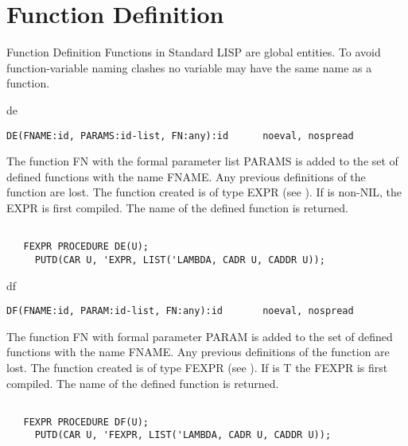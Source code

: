 \section{Function Definition}
\begin{Introduction}{Function Definition}
Functions in Standard LISP are global entities. To avoid
function-variable naming clashes no variable may have the same name as
a function. 
\end{Introduction}

\begin{Function}{de}
\begin{verbatim}
DE(FNAME:id, PARAMS:id-list, FN:any):id      noeval, nospread
\end{verbatim}
   The  function  FN with  the  formal parameter  list  PARAMS is
   added  to the  set of defined  functions with  the name FNAME.
   Any  previous  definitions  of the  function  are lost.    The
   function  created is of type EXPR (see ). If   is
   non-NIL,  the EXPR is first compiled.  The name of the defined
   function is returned.
\begin{verbatim}

   FEXPR PROCEDURE DE(U);
     PUTD(CAR U, 'EXPR, LIST('LAMBDA, CADR U, CADDR U));
\end{verbatim}
\end{Function}
\begin{Function}{df}
\begin{verbatim}
DF(FNAME:id, PARAM:id-list, FN:any):id       noeval, nospread
\end{verbatim}
   The  function FN with  formal parameter PARAM  is added to the
   set  of defined  functions with  the name  FNAME. Any previous
   definitions  of the function  are lost.   The function created
   is  of  type FEXPR (see ).  If   is  T  the FEXPR
   is  first  compiled.    The name  of the  defined  function is
   returned.
\begin{verbatim}

   FEXPR PROCEDURE DF(U);
     PUTD(CAR U, 'FEXPR, LIST('LAMBDA, CADR U, CADDR U));
\end{verbatim}

\end{Function}
